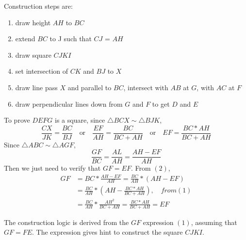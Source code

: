 \documentclass[12pt]{simple_doc.cls}
\begin{document}
	Construction steps are:
	\begin{enumerate}[topsep=0pt,itemsep=-1ex,partopsep=1ex,parsep=1ex]
		\item draw height $AH$ to $BC$
		\item extend $BC$ to J such that $CJ$ = $AH$
		\item draw square $CJKI$
		\item set intersection of $CK$ and $BJ$ to $X$
		\item draw line pass $X$ and parallel to $BC$, intersect with $AB$ at $G$, with $AC$ at $F$
		\item draw perpendicular lines down from $G$ and $F$ to get $D$ and $E$
	\end{enumerate}

	To prove $DEFG$ is a square, since $\triangle BCX \sim \triangle BJK$,
	\begin{equation}
		\frac{CX}{JK} = \frac{BC}{BJ}
		\quad \textrm{or} \quad \frac{EF}{AH} = \frac{BC}{BC + AH}
		\quad \textrm{or} \quad EF = \frac{BC * AH}{BC + AH}
	\end{equation}
	Since $\triangle ABC \sim \triangle AGF$,
	\begin{equation}
		\frac{GF}{BC} = \frac{AL}{AH} = \frac{AH - EF}{AH}
	\end{equation}
	Then we just need to verify that $GF = EF$. From $(2)$,
	\begin{equation}
		\begin{aligned}
		GF &= BC * \frac{AH - EF}{AH} = \frac{BC}{AH} *(AH - EF)\\
		   &= \frac{BC}{AH} * (AH - \frac{BC * AH}{BC + AH}), \quad from (1)\\
		   &= \frac{BC}{AH} * \frac{AH^2}{BC + AH} = \frac{BC * AH}{BC + AH} = EF
		\end{aligned}
	\end{equation}

	The construction logic is derived from the $GF$ expression $(1)$, assuming that $ GF = FE$.
	The expression gives hint to construct the square $CJKI$.
\end{document}

